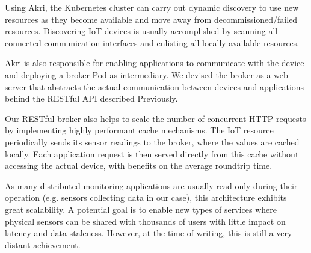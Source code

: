 
Using Akri, the Kubernetes cluster can carry out dynamic discovery to use new resources as they become available and move away from decommissioned/failed resources. Discovering IoT devices is usually accomplished by scanning all connected communication interfaces and enlisting all locally available resources.

Akri is also responsible for enabling applications to communicate with the device and deploying a broker Pod as intermediary. We devised the broker as a web server that abstracts the actual communication between devices and applications behind the RESTful API described Previously.



Our RESTful broker also helps to scale the number of concurrent HTTP requests by implementing highly performant cache mechanisms. The IoT resource periodically sends its sensor readings to the broker, where the values are cached locally. Each application request is then served directly from this cache without accessing the actual device, with benefits on the average roundtrip time.


As many distributed monitoring applications are usually read-only during their operation (e.g. sensors collecting data in our case), this architecture exhibits great scalability. A potential goal is to enable new types of services where physical sensors can be shared with thousands of users with little impact on latency and data staleness. However, at the time of writing, this is still a very distant achievement.

